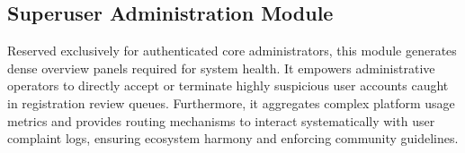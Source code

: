 \subsection{Superuser Administration Module}
Reserved exclusively for authenticated core administrators, this module generates dense overview panels required for system health. It empowers administrative operators to directly accept or terminate highly suspicious user accounts caught in registration review queues. Furthermore, it aggregates complex platform usage metrics and provides routing mechanisms to interact systematically with user complaint logs, ensuring ecosystem harmony and enforcing community guidelines.
